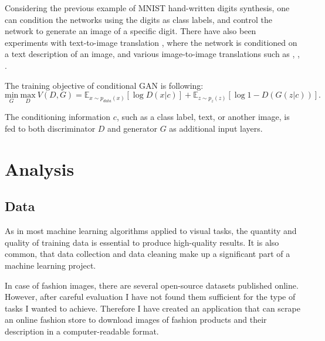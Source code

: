 \documentclass{article}
\begin{document}
Considering the previous example of MNIST hand-written digits synthesis, one can condition the networks using the digits as class labels, and control the network to generate an image of a specific digit. There have also been experiments with text-to-image translation \cite{reed_generative_2016}, where the network is conditioned on a text description of an image, and various image-to-image translations such as \cite{yoo_pixel-level_2016}, \cite{yoo_pixel-level_2016}, \cite{pathak_context_2016}.

 The training objective of conditional GAN is following:
\begin{equation}
\underset{G}{\mathrm{min}} \ \underset{D}{\mathrm{max}} \ V(D,G) = \mathbb{E}_{x \sim p_{data}(x)}[\log D(x|c)] + \mathbb{E}_{z \sim p_{z}(z)}[\log 1 - D(G(z|c))].
\label{eq:cgan}
\end{equation}

The conditioning information $c$, such as a class label, text, or another image, is fed to both discriminator $D$ and generator $G$ as additional input layers. 



\section{Analysis}

\subsection{Data}
As in most machine learning algorithms applied to visual tasks, the quantity and quality of training data is essential to produce high-quality results. It is also common, that data collection and data cleaning make up a significant part of a machine learning project.

In case of fashion images, there are several open-source datasets published online. However, after careful evaluation I have not found them sufficient for the type of tasks I wanted to achieve. Therefore I have created an application that can scrape an online fashion store to download images of fashion products and their description in a computer-readable format.

\end{document}
